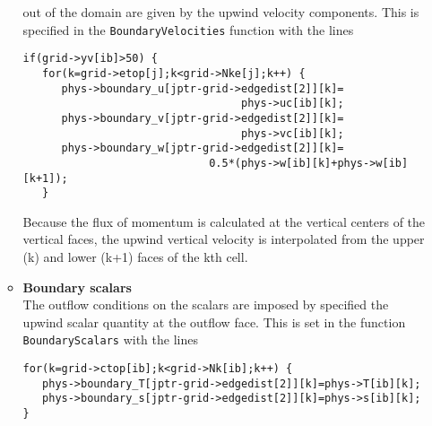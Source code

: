 \begin{itemize}
\begin{itemize}
out of the domain are given by the upwind velocity components.  This is specified in the
\verb+BoundaryVelocities+ function with the lines
\begin{verbatim}
if(grid->yv[ib]>50) {
   for(k=grid->etop[j];k<grid->Nke[j];k++) {
      phys->boundary_u[jptr-grid->edgedist[2]][k]=
                                  phys->uc[ib][k];
      phys->boundary_v[jptr-grid->edgedist[2]][k]=
                                  phys->vc[ib][k];
      phys->boundary_w[jptr-grid->edgedist[2]][k]=
                             0.5*(phys->w[ib][k]+phys->w[ib][k+1]);
   } 
\end{verbatim}
Because the flux of momentum is calculated at the vertical centers of the vertical faces,
the upwind vertical velocity is interpolated from the upper (k) and lower (k+1) faces of the kth cell.
\item[] {\bf Boundary scalars}\\
The outflow conditions on the scalars are imposed by specified the upwind scalar quantity
at the outflow face.  This is set in the function \verb+BoundaryScalars+ with the lines
\begin{verbatim}
for(k=grid->ctop[ib];k<grid->Nk[ib];k++) {
   phys->boundary_T[jptr-grid->edgedist[2]][k]=phys->T[ib][k];
   phys->boundary_s[jptr-grid->edgedist[2]][k]=phys->s[ib][k];
}
\end{verbatim}
\end{itemize}
\end{itemize}

